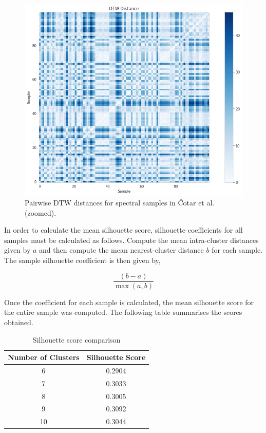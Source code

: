 \begin{figure}[t]
\centering
\includegraphics[scale=0.60]{figures/dtw cotar zoomed.png}
\caption{Pairwise DTW distances for spectral samples in Čotar et al. (zoomed).}
\end{figure}

In order to calculate the mean silhouette score, silhouette coefficients for all samples must be calculated as follows. Compute the mean intra-cluster distances given by $a$ and then compute the mean nearest-cluster distance $b$ for each sample. The sample silhouette coefficient is then given by,

\begin{equation}
\frac{(b-a)}{\max_{}(a,b)}
\end{equation}

Once the coefficient for each sample is calculated, the mean silhouette score for the entire sample was computed. The following table summarises the scores obtained.

\begin{table}[]
\begin{center}
\begin{tabular}{|c|c|}
\hline
\textbf{Number of Clusters} & \textbf{Silhouette Score} \\ \hline
6                     & 0.2904                    \\ \hline
7                     & 0.3033                    \\ \hline
8                     & 0.3005                    \\ \hline
9                     & 0.3092                    \\ \hline
10                    & 0.3044                    \\ \hline
\end{tabular}
\caption{Silhouette score comparison}
\label{table:Silhouette Score}
\end{center}
\end{table}

